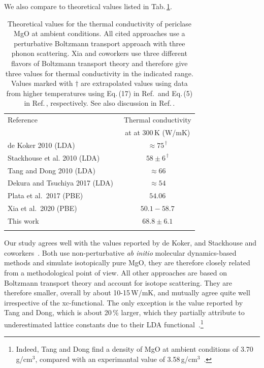 We also compare to theoretical values listed in Tab.\,\ref{tab:theo.MgO}.
%
\begin{table}[ht]
  \centering
  \selectfont
  \begin{tabular}{lc}
    \toprule
    Reference & Thermal conductivity \\
    & at at 300\,K (W/mK) \\
    \midrule
    de Koker 2010 (LDA)~\cite{Koker.2010} & $\approx 75^{\,\dagger}$ \\
    Stackhouse et al. 2010 (LDA)~\cite{Stackhouse.2010} & $58 \pm 6^{\,\dagger}$ \\
    Tang and Dong 2010 (LDA)~\cite{Tang.2010} & $\approx 66$ \\
    Dekura and Tsuchiya 2017 (LDA)~\cite{Dekura.2017} & $\approx 54$ \\
    Plata et al.~2017 (PBE)~\cite{AAPL} & $54.06$ \\
    Xia et al.~2020 (PBE)~\cite{Xia.2020} & $50.1-58.7$ \\
    This work & $68.8 \pm 6.1$ \\
    \bottomrule
    \vspace{.5em}
  \end{tabular}
  \caption{Theoretical values for the thermal conductivity of periclase MgO at ambient conditions. All cited approaches use a perturbative Boltzmann transport approach with three phonon scattering. Xia and coworkers use three different flavors of Boltzmann transport theory and therefore give three values for thermal conductivity in the indicated range. Values marked with $\dagger$ are extrapolated values using data from higher temperatures using Eq.\,(17) in Ref.\,\cite{Koker.2010} and Eq.\,(5) in Ref.\,\cite{Stackhouse.2010}, respectively. See also discussion in Ref.\,\cite{Haigis.2012}.}
  \label{tab:theo.MgO}
\end{table}
%
Our study agrees well with the values reported by de Koker, and Stackhouse and coworkers~\cite{Koker.2009,Stackhouse.2010}. Both use non-perturbative \emph{ab initio} molecular dynamics-based methods and simulate isotopically pure MgO, they are therefore closely related from a methodological point of view. All other approaches are based on Boltzmann transport theory and account for isotope scattering. They are therefore smaller, overall by about 10-15\,W/mK, and mutually agree quite well irrespective of the xc-functional. The only exception is the value reported by Tang and Dong, which is about 20\,\% larger, which they partially attribute to underestimated lattice constants due to their LDA functional~\cite{Tang.2010}.\footnote{Indeed, Tang and Dong find a density of MgO at ambient conditions of 3.70\,g/cm$^3$, compared with an experimantal value of 3.58\,g/cm$^3$~\cite{Speziale.2001}.}

